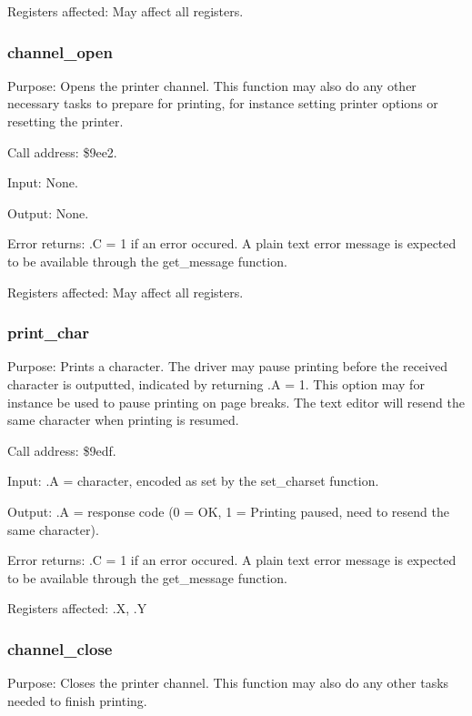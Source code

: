 \documentclass{article}
\begin{document}
            Registers affected: May affect all registers.

        \subsubsection{channel\_open}
            Purpose: Opens the printer channel. This function may also do any other
            necessary tasks to prepare for printing, for instance setting printer
            options or resetting the printer.

            Call address: \$9ee2.

            Input: None.

            Output: None.

            Error returns: .C = 1 if an error occured. A plain text error message is expected 
            to be available through the get\_message function.

            Registers affected: May affect all registers.

        \subsubsection{print\_char}
            Purpose: Prints a character. The driver may pause printing before the
            received character is outputted, indicated by returning .A = 1. This option may 
            for instance be used to pause printing on page breaks. The text editor will resend 
            the same character when printing is resumed.

            Call address: \$9edf.

            Input: .A = character, encoded as set by the set\_charset function.

            Output: .A = response code (0 = OK, 1 = Printing paused, need to resend the same
            character).

            Error returns: .C = 1 if an error occured. A plain text error message is expected
            to be available through the get\_message function.

            Registers affected: .X, .Y

        \subsubsection{channel\_close}
            Purpose: Closes the printer channel. This function may also do any other tasks
            needed to finish printing.
\end{document}
